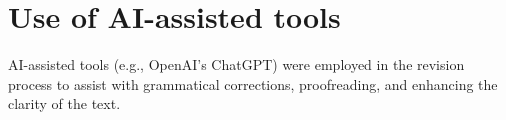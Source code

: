 \chapter{Use of AI-assisted tools}

AI-assisted tools (e.g., OpenAI's ChatGPT) were employed in the revision process to assist with grammatical corrections, proofreading, and enhancing the clarity of the text.